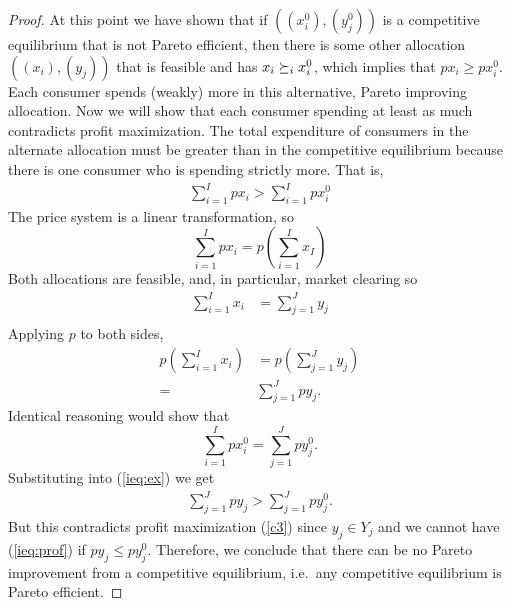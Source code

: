 \begin{proof}
  At this point we have shown that if $((x_i^0),(y_j^0))$ is a
  competitive equilibrium that is not Pareto efficient, then there is
  some other allocation $((x_i),(y_j))$ that is feasible and has $x_i
  \succeq_i x_i^0$, which implies that $p x_i \geq p x_i^0$. Each
  consumer spends (weakly) more in this alternative, Pareto improving
  allocation. Now we will show that each consumer spending at least as
  much contradicts profit maximization. The total expenditure of
  consumers in the alternate allocation must be greater than in the
  competitive equilibrium because there is one consumer who is
  spending strictly more. That is,
  \begin{align}
    \sum_{i=1}^I p x_i > \sum_{i=1}^I p x_i^0 \label{ieq:ex}
  \end{align}
  The price system is a linear transformation, so
  \[ \sum_{i=1}^I p x_i = p \left(\sum_{i=1}^I x_I \right) \]
  Both allocations are feasible, and, in particular, market clearing
  so
  \begin{align*}
    \sum_{i=1}^I x_i & = \sum_{j=1}^J y_j \\
  \end{align*}
  Applying $p$ to both sides, 
  \begin{align*}
    p\left( \sum_{i=1}^I x_i\right) & = p\left( \sum_{j=1}^J y_j
    \right) \\ 
    = & \sum_{j=1}^J p y_j.
  \end{align*}
  Identical reasoning would show that 
  \[ \sum_{i=1}^I p x_i^0 = \sum_{j=1}^J p y_j^0. \]
  Substituting into (\ref{ieq:ex}) we get
  \begin{align}
    \sum_{j=1}^J p y_j > \sum_{j=1}^J p y_j^0. \label{ieq:prof}
  \end{align}
  But this contradicts profit maximization (\ref{c3}) since $y_j \in
  Y_j$ and we cannot have (\ref{ieq:prof}) if $p y_j \leq p y_j^0$. 
  Therefore, we conclude that there can be no Pareto improvement from
  a competitive equilibrium, i.e.\ any competitive equilibrium is
  Pareto efficient.
\end{proof}










